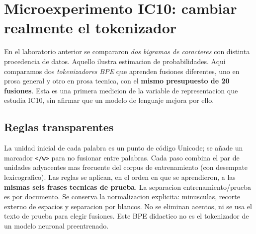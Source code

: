 
\chapter*{Microexperimento IC10: cambiar realmente el tokenizador}
\label{lab:ic10}
\begin{idea}
En el laboratorio anterior se compararon \emph{dos bigramas de caracteres}
con distinta procedencia de datos. Aquello ilustra estimacion de
probabilidades. Aqui comparamos dos \emph{tokenizadores BPE} que aprenden
fusiones diferentes, uno en prosa general y otro en prosa tecnica, con el
\textbf{mismo presupuesto de 20 fusiones}. Esta es una primera medicion de
la variable de representacion que estudia IC10, sin afirmar que un
modelo de lenguaje mejora por ello.
\end{idea}
\section*{Reglas transparentes}
La unidad inicial de cada palabra es un punto de código Unicode; se añade
un marcador \texttt{</w>} para no fusionar entre palabras. Cada paso combina
el par de unidades adyacentes mas frecuente del corpus de entrenamiento
(con desempate lexicografico). Las reglas se aplican, en el orden en que
se aprendieron, a las \textbf{mismas seis frases tecnicas de prueba}.
La separacion entrenamiento/prueba es por documento. Se conserva la
normalizacion explicita: minusculas, recorte externo de espacios y
separacion por blancos. No se eliminan acentos, ni se usa el texto de
prueba para elegir fusiones. Este BPE didactico no es el tokenizador de
un modelo neuronal preentrenado.
